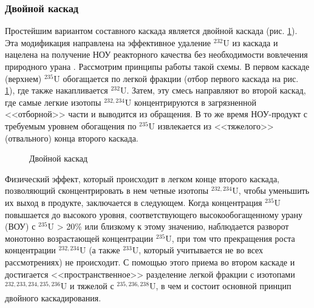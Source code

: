 \subsubsection{Двойной каскад}

Простейшим вариантом составного каскада является двойной каскада (рис. \ref{fig:double_ru}).
Эта модификация направлена на эффективное удаление $^{232}$U из каскада и нацелена на получение НОУ реакторного качества без необходимости вовлечения природного урана \cite{SosninYuChelcov, TehnicheskieResheniyaPo}.
Рассмотрим принципы работы такой схемы.
В первом каскаде (верхнем) $^{235}$U обогащается по легкой фракции (отбор первого каскада на рис. \ref{fig:double_ru}), где также накапливается $^{232}$U.
Затем, эту смесь направляют во второй каскад, где самые легкие изотопы $^{232,234}$U концентрируются в загрязненной <<отборной>> части и выводится из обращения.
В то же время НОУ-продукт с требуемым уровнем обогащения по $^{235}$U извлекается из <<тяжелого>> (отвального) конца второго каскада.
\begin{figure}[ht]
  \caption{Двойной каскад}\label{fig:double_ru}
\end{figure}

Физический эффект, который происходит в легком конце второго каскада, позволяющий сконцентрировать в нем четные изотопы $^{232,234}$U, чтобы уменьшить их выход в продукте, заключается в следующем. Когда концентрация $^{235}$U повышается до высокого уровня, соответствующего высокообогащенному урану (ВОУ) с $^{235}$U > 20\% или близкому к этому значению, наблюдается разворот монотонно возрастающей концентрации $^{235}$U, при том что прекращения роста концентрации $^{232,234}$U (а также $^{233}$U, который учитывается не во всех рассмотрениях) не происходит. С помощью этого приема во втором каскаде и достигается <<пространственное>> разделение легкой фракции с изотопами $^{232,233,234,235,236}$U и тяжелой с $^{235,236,238}$U, в чем и состоит основной принцип двойного каскадирования.

